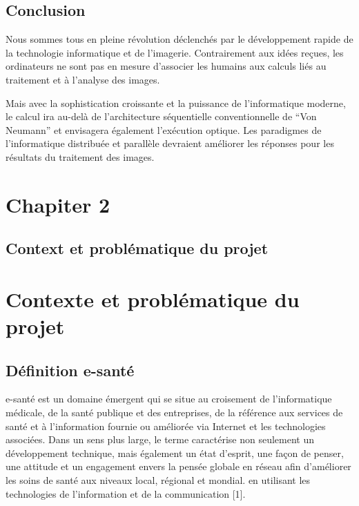 \documentclass[12pt]{article}
\begin{document}
\subsection{Conclusion}
Nous sommes tous en pleine révolution déclenchés par le développement rapide de la technologie informatique et de l'imagerie. Contrairement aux idées reçues, les ordinateurs ne sont pas en mesure d’associer les humains aux calculs liés au traitement et à l’analyse des images.

Mais avec la sophistication croissante et la puissance de l'informatique moderne, le calcul ira au-delà de l'architecture séquentielle conventionnelle de “Von Neumann” et envisagera également l'exécution optique. Les paradigmes de l'informatique distribuée et parallèle devraient améliorer les réponses pour les résultats du traitement des images.
\newpage
\section*{\Huge{Chapiter 2}}
\subsection*{\huge{Context et problématique du projet}}
\newpage
\section{Contexte et problématique du projet}
\subsection{Définition e-santé}
e-santé est un domaine émergent qui se situe au croisement de l'informatique médicale, de la santé publique et des entreprises, de la référence aux services de santé et à l'information fournie ou améliorée via Internet et les technologies associées. Dans un sens plus large, le terme caractérise non seulement un développement technique, mais également un état d'esprit, une façon de penser, une attitude et un engagement envers la pensée globale en réseau afin d'améliorer les soins de santé aux niveaux local, régional et mondial. en utilisant les technologies de l'information et de la communication [1].
\end{document}

